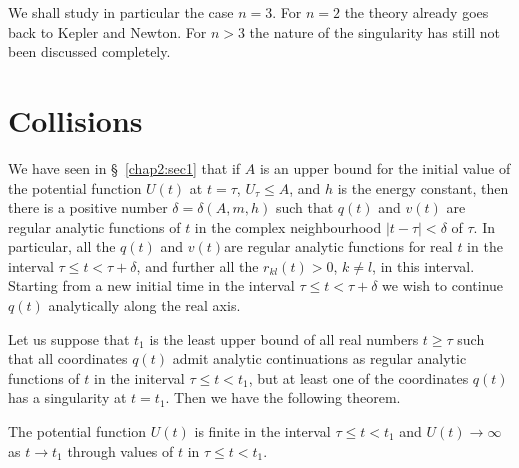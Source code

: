 We shall study in particular the case $n=3$. For $n=2$ the theory already goes back to Kepler and Newton. For $n>3$ the nature of the singularity has still not been discussed completely.

\section{Collisions}\label{chap2:sec2}

We have seen in \S\ \ref{chap2:sec1} that if $A$ is an upper bound for the initial value of the potential function $U(t)$ at $t = \tau$, $U_\tau \leq A$, and $h$ is the energy constant, then there is a positive number $\delta =\delta (A,m,h)$ such that $q(t)$ and $v(t)$ are regular analytic functions of $t$ in the complex neighbourhood $|t-\tau| < \delta $ of $\tau$. In particular, all the $q(t)$ and $v(t)$\pageoriginale are regular analytic functions for real $t$ in the interval $\tau \leq t < \tau + \delta$, and further all the $r_{kl} (t) >0$, $k \neq l$, in this interval. Starting from a new initial time in the interval $\tau\leq t < \tau + \delta$ we wish to continue $q(t)$ analytically along the real axis.

Let us suppose that $t_1$ is the least upper bound of all real numbers $t \geq \tau$ such that all coordinates $q(t)$ admit analytic continuations as regular analytic functions of $t$ in the initerval $\tau \leq t < t_1$, but at least one of the coordinates $q(t)$ has a singularity at $t = t_1$. Then we have the following theorem.

\begin{subtheorem}\label{chap2:thm2.2.1}
The potential function $U(t)$ is finite in the interval $\tau \leq t < t_1$ and $U(t) \to \infty$ as $ t \to t_1$ through values of $t$ in $\tau \leq t < t_1$. 
\end{subtheorem}


